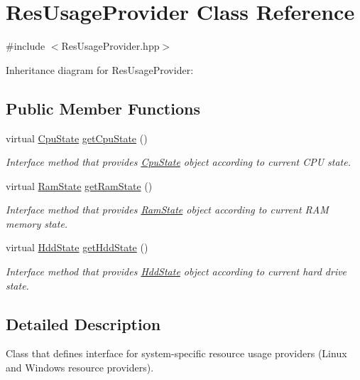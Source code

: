 \hypertarget{classResUsageProvider}{}\section{Res\+Usage\+Provider Class Reference}
\label{classResUsageProvider}


{\ttfamily \#include $<$Res\+Usage\+Provider.\+hpp$>$}



Inheritance diagram for Res\+Usage\+Provider\+:
\subsection*{Public Member Functions}
\begin{DoxyCompactItemize}
\item 
virtual \hyperlink{classCpuState}{Cpu\+State} \hyperlink{classResUsageProvider_a7c870e3b73ff64a908d7b8f55f277b3e}{get\+Cpu\+State} ()
\begin{DoxyCompactList}\small\item\em Interface method that provides \hyperlink{classCpuState}{Cpu\+State} object according to current C\+PU state. \end{DoxyCompactList}\item 
virtual \hyperlink{classRamState}{Ram\+State} \hyperlink{classResUsageProvider_ac992fba31e9212759ff1423583e98b42}{get\+Ram\+State} ()
\begin{DoxyCompactList}\small\item\em Interface method that provides \hyperlink{classRamState}{Ram\+State} object according to current R\+AM memory state. \end{DoxyCompactList}\item 
virtual \hyperlink{classHddState}{Hdd\+State} \hyperlink{classResUsageProvider_af77f53b73bea76a925a6a6fd24c356fb}{get\+Hdd\+State} ()
\begin{DoxyCompactList}\small\item\em Interface method that provides \hyperlink{classHddState}{Hdd\+State} object according to current hard drive state. \end{DoxyCompactList}\end{DoxyCompactItemize}


\subsection{Detailed Description}
Class that defines interface for system-\/specific resource usage providers (Linux and Windows resource providers). 

